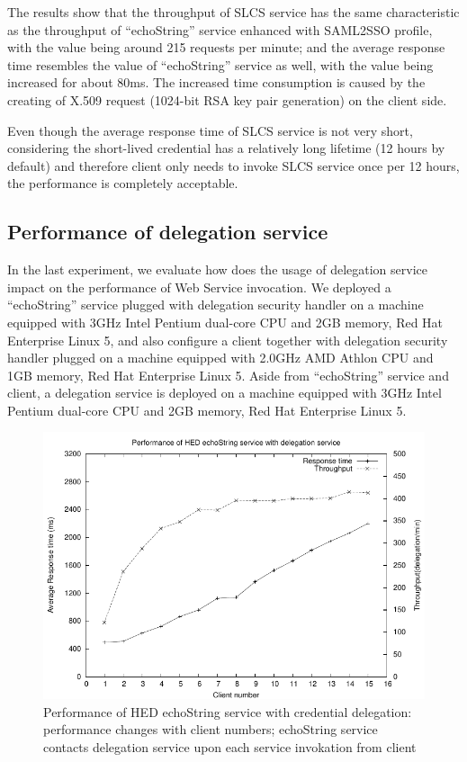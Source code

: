 \documentclass[conference]{IEEEtran}
\begin{document}
The results show that the throughput of SLCS service has the same characteristic as the throughput
of ``echoString'' service enhanced with SAML2SSO profile, with the value being around 215 
requests per minute; and the average response time resembles the value of ``echoString'' service as 
well, with the value being increased for about 80ms. The increased time consumption is caused by 
the creating of X.509 request (1024-bit RSA key pair generation) on the client side.

Even though the average response time of SLCS service is not very short, considering the short-lived 
credential has a relatively long lifetime (12 hours by default) and therefore client only needs to invoke
SLCS service once per 12 hours, the performance is completely acceptable.

\subsection{Performance of delegation service}
\label{sec:perfdelegserv}

In the last experiment, we evaluate how does the usage of delegation service impact on the 
performance of Web Service invocation. We deployed a ``echoString'' service plugged with delegation
security handler on a machine equipped with 3GHz Intel Pentium dual-core CPU and 2GB memory, Red 
Hat Enterprise Linux 5, and also configure a client together with delegation security handler plugged 
on a machine equipped with 2.0GHz AMD Athlon CPU and 1GB memory, Red Hat Enterprise Linux 5. Aside from 
``echoString'' service and client, a delegation service is deployed on a machine equipped with 
3GHz Intel Pentium dual-core CPU and 2GB memory, Red Hat Enterprise Linux 5.

\begin{figure}
\includegraphics[width=0.9\columnwidth]{Delegation_thread_to_perf.pdf}
\caption{Performance of HED echoString service with credential delegation: performance 
changes with client numbers; echoString service contacts delegation service upon each service 
invokation from client}
\label{fig:Delegation_thread_to_perf}
\end{figure}
\end{document}
